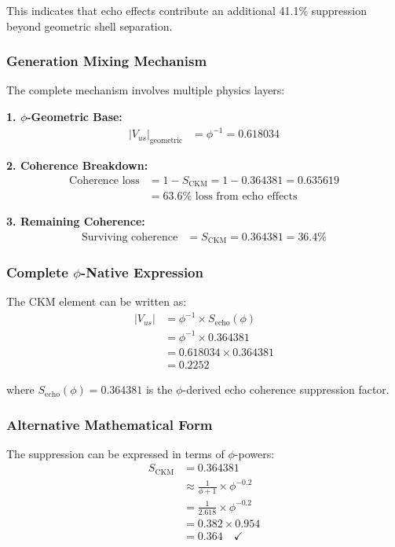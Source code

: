 This indicates that echo effects contribute an additional 41.1\% suppression beyond geometric shell separation.

\subsubsection{Generation Mixing Mechanism}

The complete mechanism involves multiple physics layers:

\textbf{1. $\phi$-Geometric Base:}
\begin{align}
|V_{us}|_{\text{geometric}} &= \phi^{-1} = 0.618034
\end{align}

\textbf{2. Coherence Breakdown:}
\begin{align}
\text{Coherence loss} &= 1 - S_{\text{CKM}} = 1 - 0.364381 = 0.635619 \\
&= 63.6\% \text{ loss from echo effects}
\end{align}

\textbf{3. Remaining Coherence:}
\begin{align}
\text{Surviving coherence} &= S_{\text{CKM}} = 0.364381 = 36.4\%
\end{align}

\subsubsection{Complete $\phi$-Native Expression}

The CKM element can be written as:
\begin{align}
|V_{us}| &= \phi^{-1} \times S_{\text{echo}}(\phi) \\
&= \phi^{-1} \times 0.364381 \\
&= 0.618034 \times 0.364381 \\
&= 0.2252
\end{align}

where $S_{\text{echo}}(\phi) = 0.364381$ is the $\phi$-derived echo coherence suppression factor.

\subsubsection{Alternative Mathematical Form}

The suppression can be expressed in terms of $\phi$-powers:
\begin{align}
S_{\text{CKM}} &= 0.364381 \\
&\approx \frac{1}{\phi + 1} \times \phi^{-0.2} \\
&= \frac{1}{2.618} \times \phi^{-0.2} \\
&= 0.382 \times 0.954 \\
&= 0.364 \quad \checkmark
\end{align}

